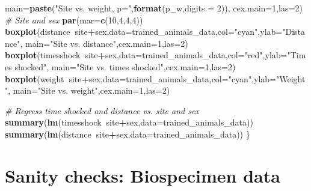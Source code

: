\documentclass[]{article}
\newenvironment{Shaded}{\begin{snugshade}}{\end{snugshade}}
\newcommand{\KeywordTok}[1]{\textcolor[rgb]{0.13,0.29,0.53}{\textbf{#1}}}
\newcommand{\DataTypeTok}[1]{\textcolor[rgb]{0.13,0.29,0.53}{#1}}
\newcommand{\DecValTok}[1]{\textcolor[rgb]{0.00,0.00,0.81}{#1}}
\newcommand{\StringTok}[1]{\textcolor[rgb]{0.31,0.60,0.02}{#1}}
\newcommand{\CommentTok}[1]{\textcolor[rgb]{0.56,0.35,0.01}{\textit{#1}}}
\newcommand{\OperatorTok}[1]{\textcolor[rgb]{0.81,0.36,0.00}{\textbf{#1}}}
\newcommand{\NormalTok}[1]{#1}
\begin{document}
\begin{Shaded}
\begin{Highlighting}[]
        \DataTypeTok{main=}\KeywordTok{paste}\NormalTok{(}\StringTok{"Site vs. weight, p="}\NormalTok{,}\KeywordTok{format}\NormalTok{(p_w,}\DataTypeTok{digits =} \DecValTok{2}\NormalTok{)),}
        \DataTypeTok{cex.main=}\DecValTok{1}\NormalTok{,}\DataTypeTok{las=}\DecValTok{2}\NormalTok{)}
  \CommentTok{# Site and sex}
  \KeywordTok{par}\NormalTok{(}\DataTypeTok{mar=}\KeywordTok{c}\NormalTok{(}\DecValTok{10}\NormalTok{,}\DecValTok{4}\NormalTok{,}\DecValTok{4}\NormalTok{,}\DecValTok{4}\NormalTok{))}
  \KeywordTok{boxplot}\NormalTok{(distance}\OperatorTok{~}\NormalTok{site}\OperatorTok{+}\NormalTok{sex,}\DataTypeTok{data=}\NormalTok{trained_animals_data,}\DataTypeTok{col=}\StringTok{"cyan"}\NormalTok{,}\DataTypeTok{ylab=}\StringTok{"Distance"}\NormalTok{,}
        \DataTypeTok{main=}\StringTok{"Site vs. distance"}\NormalTok{,}\DataTypeTok{cex.main=}\DecValTok{1}\NormalTok{,}\DataTypeTok{las=}\DecValTok{2}\NormalTok{)}
  \KeywordTok{boxplot}\NormalTok{(timesshock}\OperatorTok{~}\NormalTok{site}\OperatorTok{+}\NormalTok{sex,}\DataTypeTok{data=}\NormalTok{trained_animals_data,}\DataTypeTok{col=}\StringTok{"red"}\NormalTok{,}\DataTypeTok{ylab=}\StringTok{"Times shocked"}\NormalTok{,}
        \DataTypeTok{main=}\StringTok{"Site vs. times shocked"}\NormalTok{,}\DataTypeTok{cex.main=}\DecValTok{1}\NormalTok{,}\DataTypeTok{las=}\DecValTok{2}\NormalTok{)}
  \KeywordTok{boxplot}\NormalTok{(weight}\OperatorTok{~}\NormalTok{site}\OperatorTok{+}\NormalTok{sex,}\DataTypeTok{data=}\NormalTok{trained_animals_data,}\DataTypeTok{col=}\StringTok{"cyan"}\NormalTok{,}\DataTypeTok{ylab=}\StringTok{"Weight"}\NormalTok{,}
        \DataTypeTok{main=}\StringTok{"Site vs. weight"}\NormalTok{,}\DataTypeTok{cex.main=}\DecValTok{1}\NormalTok{,}\DataTypeTok{las=}\DecValTok{2}\NormalTok{)}

  \CommentTok{# Regress time shocked and distance vs. site and sex}
  \KeywordTok{summary}\NormalTok{(}\KeywordTok{lm}\NormalTok{(timesshock}\OperatorTok{~}\NormalTok{site}\OperatorTok{+}\NormalTok{sex,}\DataTypeTok{data=}\NormalTok{trained_animals_data))}
  \KeywordTok{summary}\NormalTok{(}\KeywordTok{lm}\NormalTok{(distance}\OperatorTok{~}\NormalTok{site}\OperatorTok{+}\NormalTok{sex,}\DataTypeTok{data=}\NormalTok{trained_animals_data))  }
\NormalTok{  \}}
\end{Highlighting}
\end{Shaded}

\section{Sanity checks: Biospecimen
data}\label{sanity-checks-biospecimen-data}
\end{document}
